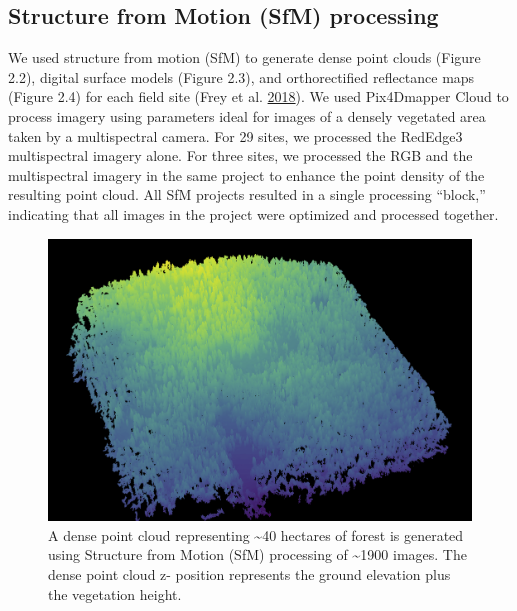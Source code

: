 \documentclass[twoside,12pt,final]{ucthesis-CA2012}
\begin{document}
\begin{ucmainmatter}
\subsection{Structure from Motion (SfM)
processing}\label{structure-from-motion-sfm-processing}

We used structure from motion (SfM) to generate dense point clouds
(Figure 2.2), digital surface models (Figure 2.3), and orthorectified
reflectance maps (Figure 2.4) for each field site (Frey et al.
\protect\hyperlink{ref-frey2018}{2018}). We used Pix4Dmapper Cloud to
process imagery using parameters ideal for images of a densely vegetated
area taken by a multispectral camera. For 29 sites, we processed the
RedEdge3 multispectral imagery alone. For three sites, we processed the
RGB and the multispectral imagery in the same project to enhance the
point density of the resulting point cloud. All SfM projects resulted in
a single processing ``block,'' indicating that all images in the project
were optimized and processed together.
\begin{figure}
\centering
\includegraphics[width=6.00000in]{figure/chap02/eldo_3k_3_point_cloud.png}
\caption{A dense point cloud representing \textasciitilde{}40 hectares
of forest is generated using Structure from Motion (SfM) processing of
\textasciitilde{}1900 images. The dense point cloud z- position
represents the ground elevation plus the vegetation height.}
\end{figure}
\begin{figure}
\centering

\end{figure}
\end{ucmainmatter}
\end{document}
